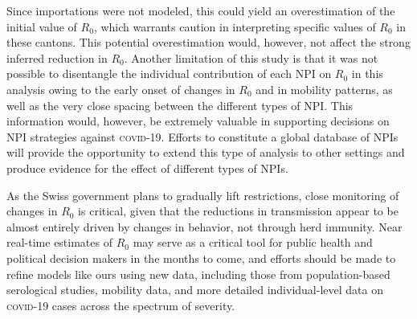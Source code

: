   Since importations were not modeled, this could yield an overestimation of the initial value of $R_0$, which warrants caution in interpreting specific values of $R_0$ in these cantons. This potential overestimation would, however, not affect the strong inferred reduction in $R_0$. Another limitation of this study is that it was not possible to disentangle the individual contribution of each NPI on $R_0$ in this analysis owing to the early onset of changes in $R_0$ and in mobility patterns, as well as the very close spacing between the different types of NPI. This information would, however, be extremely valuable in supporting decisions on NPI strategies against \textsc{covid}-19. Efforts to constitute a global database of NPIs will provide the opportunity to extend this type of analysis to other settings and produce evidence for the effect of different types of NPIs\cite{HITCOVIDTeam:HealthInterventionsTracking:2020}. 
  
  As the Swiss government plans to gradually lift restrictions, close monitoring of changes in $R_0$ is critical, given that the reductions in transmission appear to be almost entirely driven by changes in behavior, not through herd immunity. Near real-time estimates of $R_0$ may serve as a critical tool for public health and political decision makers in the months to come, and efforts should be made to refine models like ours using new data, including those from population-based serological studies, mobility data, and more detailed individual-level data on \textsc{covid}-19 cases across the spectrum of severity.

